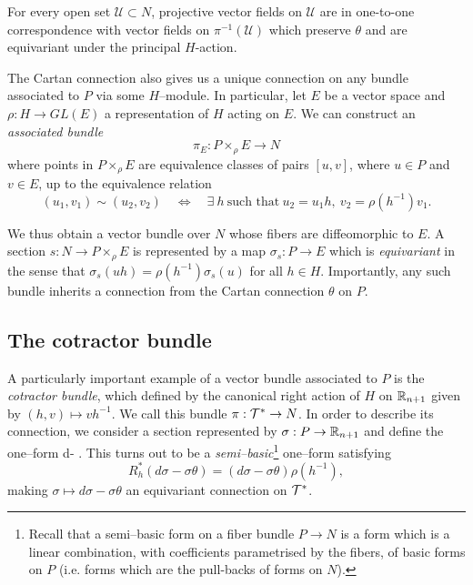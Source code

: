 \begin{rmk} \label{rmk:theta_symmetry}
For every open set $\mathcal{U}\subset N$, projective vector fields on $\mathcal{U}$ are in one-to-one correspondence with vector fields on $\pi^{-1}(\mathcal{U})$
which preserve $\theta$ and are equivariant  under the principal $H$-action.
\end{rmk}


\begin{rmk}
The Cartan connection also gives us a unique connection on any bundle associated to $P$ via some $H$--module. In particular, let $E$ be a vector space and $\rho:H\rightarrow GL(E)$ a representation of $H$ acting on $E$. We can construct an \textit{associated bundle}
\[\pi_E:P\times_\rho E\rightarrow N \]
where points in $P\times_\rho E$ are equivalence classes of pairs $[u,v]$, where $u\in P$ and $v\in E$, up to the equivalence relation
\[
(u_1,v_1)\sim (u_2,v_2) \quad \Leftrightarrow \quad \exists\ h\ \mbox{such that}\  u_2=u_1 h,\  v_2 = \rho(h^{-1}) v_1.
\]

We thus obtain a vector bundle over $N$ whose fibers are diffeomorphic to $E$. A section $s:N\rightarrow P\times_\rho E$ is represented by a map $\sigma_s:P\rightarrow E$ which is \textit{equivariant} in the sense that $ \sigma_s(uh)=\rho(h^{-1})\sigma_s(u)$ for all $h\in H$. Importantly, any such bundle inherits a connection from the Cartan connection $\theta$ on $P$.
\end{rmk}


\subsection{The cotractor bundle}
A particularly important example of a vector bundle associated to $P$ is the \textit{cotractor bundle}, which defined by the canonical right action of $H$ on $\mathbb{R}_{n+1}$ given by $(h,v)\mapsto vh^{-1}$. We call this bundle $\pi:\mathcal{T}^*\rightarrow N$. In order to describe its connection, we consider a section represented by $\sigma:P\rightarrow\mathbb{R}_{n+1}$ and define the one--form
\be \label{eq:df-ftheta}
d\sigma - \sigma\theta.
\ee
This turns out to be a \textit{semi--basic}\footnote{Recall that a semi--basic form on a fiber bundle $P\rightarrow N$ is a form which is a linear combination, with coefficients parametrised by the fibers, of basic forms on $P$ (i.e. forms which are the pull-backs of forms on $N$).} one--form satisfying
\[
R_h^*(d\sigma-\sigma\theta) = (d\sigma - \sigma\theta)\rho(h^{-1}),
\]
making $\sigma\mapsto d\sigma-\sigma\theta$ an equivariant connection on $\mathcal{T}^*$.

